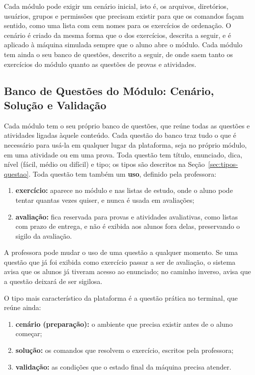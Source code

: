 Cada módulo pode exigir um cenário inicial, isto é, os arquivos, diretórios, usuários, grupos e permissões que precisam existir para que os comandos façam sentido, como uma lista com cem nomes para os exercícios de ordenação. O cenário é criado da mesma forma que o dos exercícios, descrita a seguir, e é aplicado à máquina simulada sempre que o aluno abre o módulo. Cada módulo tem ainda o seu banco de questões, descrito a seguir, de onde saem tanto os exercícios do módulo quanto as questões de provas e atividades.

\subsection{Banco de Questões do Módulo: Cenário, Solução e Validação}
\label{sec:banco-exercicios}

Cada módulo tem o seu próprio banco de questões, que reúne todas as questões e atividades ligadas àquele conteúdo. Cada questão do banco traz tudo o que é necessário para usá-la em qualquer lugar da plataforma, seja no próprio módulo, em uma atividade ou em uma prova. Toda questão tem título, enunciado, dica, nível (fácil, médio ou difícil) e tipo; os tipos são descritos na Seção~\ref{sec:tipos-questao}. Toda questão tem também um \textbf{uso}, definido pela professora:

\begin{enumerate}
    \item \textbf{exercício:} aparece no módulo e nas listas de estudo, onde o aluno pode tentar quantas vezes quiser, e nunca é usada em avaliações;
    \item \textbf{avaliação:} fica reservada para provas e atividades avaliativas, como listas com prazo de entrega, e não é exibida aos alunos fora delas, preservando o sigilo da avaliação.
\end{enumerate}

A professora pode mudar o uso de uma questão a qualquer momento. Se uma questão que já foi exibida como exercício passar a ser de avaliação, o sistema avisa que os alunos já tiveram acesso ao enunciado; no caminho inverso, avisa que a questão deixará de ser sigilosa.

O tipo mais característico da plataforma é a questão prática no terminal, que reúne ainda:

\begin{enumerate}
    \item \textbf{cenário (preparação):} o ambiente que precisa existir antes de o aluno começar;
    \item \textbf{solução:} os comandos que resolvem o exercício, escritos pela professora;
    \item \textbf{validação:} as condições que o estado final da máquina precisa atender.
\end{enumerate}

